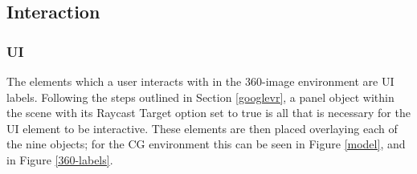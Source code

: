\documentclass[ %
                    author={Elis Jones},
                supervisor={Dr. Kirsten Cater},
                    degree={BSc},
                     title={The Effect of Presentation Medium on Spatial Cognition},
                  subtitle={in the Virtual Environment},
                      year={2018} ]{dissertation}
\begin{document}
\subsection{Interaction}

\subsubsection{UI}
The elements which a user interacts with in the 360-image environment are UI labels. Following the steps outlined in Section \ref{googlevr}, a panel object within the scene with its Raycast Target option set to true is all that is necessary for the UI element to be interactive. These elements are then placed overlaying each of the nine objects; for the CG environment this can be seen in Figure \ref{model}, and in Figure \ref{360-labels}. 
\end{document}
